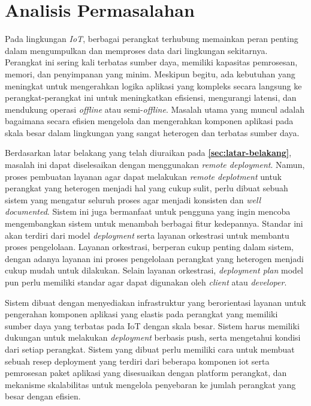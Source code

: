 \section{Analisis Permasalahan}
\label{sec:analisis-permasalahan}

Pada lingkungan \textit{IoT}, berbagai perangkat terhubung memainkan peran penting dalam mengumpulkan dan memproses data dari lingkungan sekitarnya. Perangkat ini sering kali terbatas sumber daya, memiliki kapasitas pemrosesan, memori, dan penyimpanan yang minim. Meskipun begitu, ada kebutuhan yang meningkat untuk mengerahkan logika aplikasi yang kompleks secara langsung ke perangkat-perangkat ini untuk meningkatkan efisiensi, mengurangi latensi, dan mendukung operasi \textit{offline} atau semi-\textit{offline}. Masalah utama yang muncul adalah bagaimana secara efisien mengelola dan mengerahkan komponen aplikasi pada skala besar dalam lingkungan yang sangat heterogen dan terbatas sumber daya.

Berdasarkan latar belakang yang telah diuraikan pada \textbf{\ref{sec:latar-belakang}}, masalah ini dapat diselesaikan dengan menggunakan \textit{remote deployment}. Namun, proses pembuatan layanan agar dapat melakukan \textit{remote deplotment} untuk perangkat yang heterogen menjadi hal yang cukup sulit, perlu dibuat sebuah sistem yang mengatur seluruh proses agar menjadi konsisten dan \textit{well documented}. Sistem ini juga bermanfaat untuk pengguna yang ingin mencoba mengembangkan sistem untuk menambah berbagai fitur kedepannya. Standar ini akan terdiri dari model \textit{deployment} serta layanan orkestrasi untuk membantu proses pengelolaan. Layanan orkestrasi, berperan cukup penting dalam sistem, dengan adanya layanan ini proses pengelolaan perangkat yang heterogen menjadi cukup mudah untuk dilakukan. Selain layanan orkestrasi, \textit{deployment plan} model pun perlu memiliki standar agar dapat digunakan oleh \textit{client} atau \textit{developer}.

Sistem dibuat dengan menyediakan infrastruktur yang berorientasi layanan untuk pengerahan komponen aplikasi yang elastis pada perangkat yang memiliki sumber daya yang terbatas pada IoT dengan skala besar. Sistem harus memiliki dukungan untuk melakukan \textit{deployment} berbasis push, serta mengetahui kondisi dari setiap perangkat. Sistem yang dibuat perlu memiliki cara untuk membuat sebuah resep deployment yang terdiri dari beberapa komponen iot serta
pemrosesan paket aplikasi yang disesuaikan dengan platform perangkat, dan mekanisme skalabilitas untuk mengelola penyebaran ke jumlah perangkat yang besar dengan efisien.

